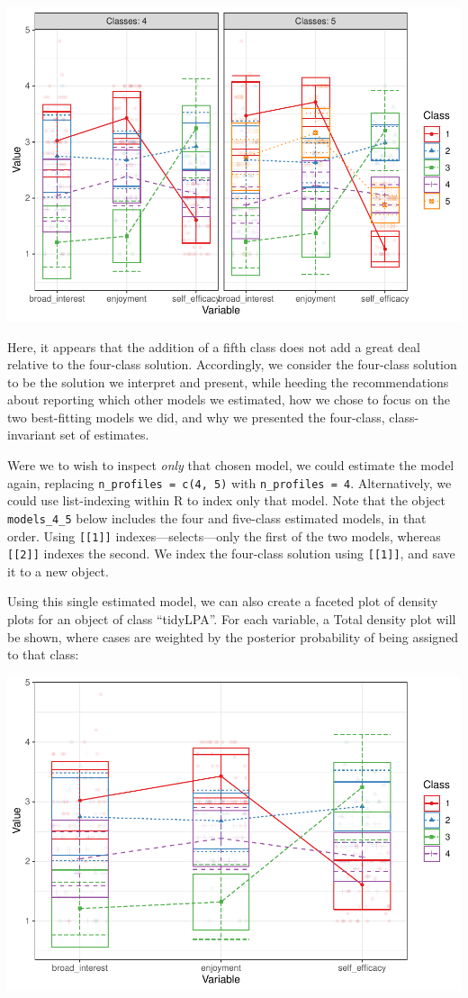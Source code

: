 \documentclass[man]{apa6}
\begin{document}
\includegraphics{paper_files/figure-latex/unnamed-chunk-8-1.pdf}

Here, it appears that the addition of a fifth class does not add a great deal relative to the four-class solution. Accordingly, we consider the four-class solution to be the solution we interpret and present, while heeding the recommendations about reporting which other models we estimated, how we chose to focus on the two best-fitting models we did, and why we presented the four-class, class-invariant set of estimates.

Were we to wish to inspect \emph{only} that chosen model, we could estimate the model again, replacing \texttt{n\_profiles\ =\ c(4,\ 5)} with \texttt{n\_profiles\ =\ 4}. Alternatively, we could use list-indexing within R to index only that model. Note that the object \texttt{models\_4\_5} below includes the four and five-class estimated models, in that order. Using \texttt{{[}{[}1{]}{]}} indexes---selects---only the first of the two models, whereas \texttt{{[}{[}2{]}{]}} indexes the second. We index the four-class solution using \texttt{{[}{[}1{]}{]}}, and save it to a new object.

Using this single estimated model, we can also create a faceted plot of density plots for an object of class \enquote{tidyLPA}. For each variable, a Total density plot will be shown, where cases are weighted by the posterior probability of being assigned to that class:

\includegraphics{paper_files/figure-latex/unnamed-chunk-10-1.pdf}
\end{document}
